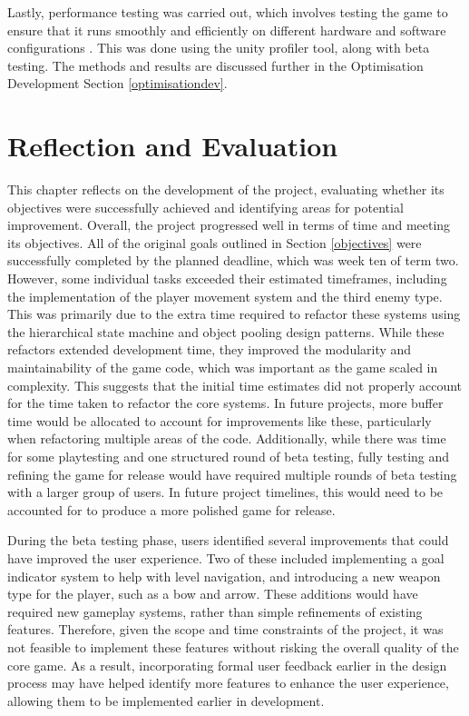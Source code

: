 \documentclass[10pt]{final_report}
\begin{document}
Lastly, performance testing was carried out, which involves testing the game to ensure that it runs smoothly and efficiently on different hardware and software configurations \cite{UnityTesting}. This was done using the unity profiler tool, along with beta testing. The methods and results are discussed further in the Optimisation Development Section \ref{optimisationdev}.  

\chapter{Reflection and Evaluation}\label{reflection}

This chapter reflects on the development of the project, evaluating whether its objectives were successfully achieved and identifying areas for potential improvement. 
\newline
Overall, the project progressed well in terms of time and meeting its objectives. All of the original goals outlined in Section \ref{objectives} were successfully completed by the planned deadline, which was week ten of term two. However, some individual tasks exceeded their estimated timeframes, including the implementation of the player movement system and the third enemy type. This was primarily due to the extra time required to refactor these systems using the hierarchical state machine and object pooling design patterns.
While these refactors extended development time, they improved the modularity and maintainability of the game code, which was important as the game scaled in complexity. This suggests that the initial time estimates did not properly account for the time taken to refactor the core systems. In future projects, more buffer time would be allocated to account for improvements like these, particularly when refactoring multiple areas of the code.
\newline
Additionally, while there was time for some playtesting and one structured round of beta testing, fully testing and refining the game for release would have required multiple rounds of beta testing with a larger group of users. In future project timelines, this would need to be accounted for to produce a more polished game for release. \newline

During the beta testing phase, users identified several improvements that could have improved the user experience. Two of these included implementing a goal indicator system to help with level navigation, and introducing a new weapon type for the player, such as a bow and arrow. These additions would have required new gameplay systems, rather than simple refinements of existing features. Therefore, given the scope and time constraints of the project, it was not feasible to implement these features without risking the overall quality of the core game.
As a result, incorporating formal user feedback earlier in the design process may have helped identify more features to enhance the user experience, allowing them to be implemented earlier in development. \newline
\end{document}
